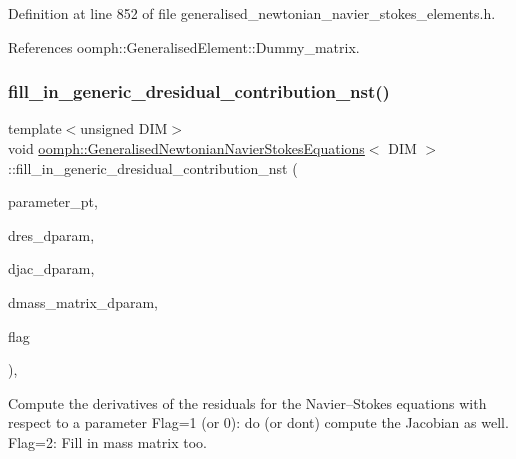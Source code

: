 Definition at line 852 of file generalised\+\_\+newtonian\+\_\+navier\+\_\+stokes\+\_\+elements.\+h.



References oomph\+::\+Generalised\+Element\+::\+Dummy\+\_\+matrix.

\mbox{\label{classoomph_1_1GeneralisedNewtonianNavierStokesEquations_ac2caf28f72624aadf6a86e1dac0fd079}} 
\subsubsection{\texorpdfstring{fill\+\_\+in\+\_\+generic\+\_\+dresidual\+\_\+contribution\+\_\+nst()}{fill\_in\_generic\_dresidual\_contribution\_nst()}}
{\footnotesize\ttfamily template$<$unsigned D\+IM$>$ \\
void \hyperlink{classoomph_1_1GeneralisedNewtonianNavierStokesEquations}{oomph\+::\+Generalised\+Newtonian\+Navier\+Stokes\+Equations}$<$ D\+IM $>$\+::fill\+\_\+in\+\_\+generic\+\_\+dresidual\+\_\+contribution\+\_\+nst (\begin{DoxyParamCaption}\item[{double $\ast$const \&}]{parameter\+\_\+pt,  }\item[{\hyperlink{classoomph_1_1Vector}{Vector}$<$ double $>$ \&}]{dres\+\_\+dparam,  }\item[{\hyperlink{classoomph_1_1DenseMatrix}{Dense\+Matrix}$<$ double $>$ \&}]{djac\+\_\+dparam,  }\item[{\hyperlink{classoomph_1_1DenseMatrix}{Dense\+Matrix}$<$ double $>$ \&}]{dmass\+\_\+matrix\+\_\+dparam,  }\item[{unsigned}]{flag }\end{DoxyParamCaption})\hspace{0.3cm}{\ttfamily [protected]}, {\ttfamily [virtual]}}



Compute the derivatives of the residuals for the Navier--Stokes equations with respect to a parameter Flag=1 (or 0)\+: do (or don\textquotesingle{}t) compute the Jacobian as well. Flag=2\+: Fill in mass matrix too. 

